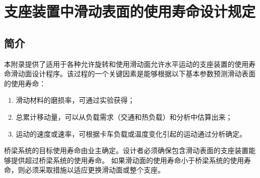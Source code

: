 \chapter{支座装置中滑动表面的使用寿命设计规定}
\label{chp:provison-slide-surface}
\section{简介}
本附录提供了适用于各种允许旋转和使用滑动面允许水平运动的支座装置的使用寿命滑动面设计程序。该过程的一个关键因素是能够根据以下基本参数预测滑动表面的使用寿命：
\begin{enumerate}
  \item 滑动材料的磨损率，可通过实验获得；
  \item 总累计移动量，可以从负载需求（交通和热负载）和分析中估算出来；
  \item 运动的速度或速率，可根据卡车负载或温度变化引起的运动通过分析确定。
\end{enumerate}

桥梁系统的目标使用寿命由业主确定。设计者必须确保包含滑动表面的支座装置能够提供超过桥梁系统的使用寿命。 如果滑动面的使用寿命小于桥梁系统的使用寿命，则必须采取措施以适应更换滑动面或整个支座。


